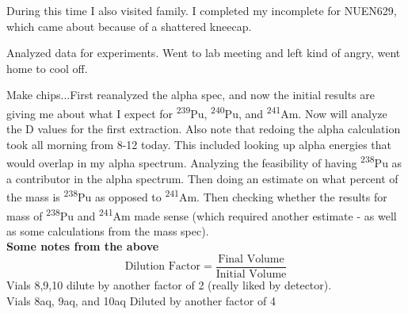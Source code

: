 \documentclass[idxtotoc,hyperref,openany,oneside]{labbook} %
\newcommand{\tss}{\textsuperscript}
\begin{document}
During this time I also visited family. I completed my incomplete
for NUEN629, which came about because of a shattered kneecap.




Analyzed data for experiments. Went to lab meeting and left
kind of angry, went home to cool off.




Make chips...First reanalyzed the alpha spec, and now
the initial results are giving me about what I expect for \tss{239}Pu,
\tss{240}Pu, and \tss{241}Am. Now will analyze the D values for the
first extraction. Also note that redoing the alpha calculation took
all morning from 8-12 today. This included looking up alpha energies that
would overlap in my alpha spectrum. Analyzing the feasibility of having
\tss{238}Pu as a contributor in the alpha spectrum. Then doing an estimate
on what percent of the mass is \tss{238}Pu as opposed to \tss{241}Am.
Then checking whether the results for mass of \tss{238}Pu and \tss{241}Am
made sense (which required another estimate - as well as some calculations
from the mass spec).\\

\textbf{Some notes from the above}
\begin{equation*}
\text{Dilution Factor}=\frac{\text{Final Volume}}{\text{Initial Volume}}
\end{equation*}
Vials 8,9,10 dilute by another factor of 2 (really liked by detector).\\
Vials 8aq, 9aq, and 10aq Diluted by another factor of 4\\~\\
\end{document}
